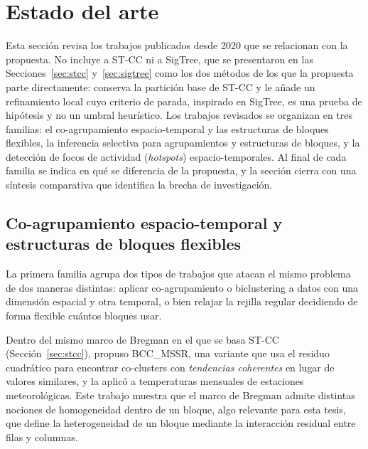 
\section{Estado del arte}
\label{sec:estado-arte}

Esta sección revisa los trabajos publicados desde 2020 que se relacionan con la
propuesta. No incluye a \ac{ST-CC} ni a SigTree, que se presentaron en las
Secciones~\ref{sec:stcc} y~\ref{sec:sigtree} como los dos métodos de los que la
propuesta parte directamente: conserva la partición base de \ac{ST-CC} y le
añade un refinamiento local cuyo criterio de parada, inspirado en SigTree, es una
prueba de hipótesis y no un umbral heurístico. Los trabajos revisados se
organizan en tres familias: el co-agrupamiento espacio-temporal y las
estructuras de bloques flexibles, la inferencia selectiva para agrupamientos y
estructuras de bloques, y la detección de focos de actividad (\emph{hotspots})
espacio-temporales. Al final de cada familia se indica en qué se diferencia de la
propuesta, y la sección cierra con una síntesis comparativa que identifica la
brecha de investigación.

\subsection{Co-agrupamiento espacio-temporal y estructuras de bloques flexibles}
\label{sec:ea_coagrupamiento}

La primera familia agrupa dos tipos de trabajos que atacan el mismo
problema de dos maneras distintas: aplicar co-agrupamiento o biclustering a
datos con una dimensión espacial y otra temporal, o bien relajar la rejilla
regular decidiendo de forma flexible cuántos bloques usar.

Dentro del mismo marco de Bregman en el que se basa \ac{ST-CC}
(Sección~\ref{sec:stcc}), \cite{Wu2022} propuso BCC\_MSSR, una
variante que usa el residuo cuadrático para encontrar co-clusters con
\emph{tendencias coherentes} en lugar de valores similares, y la aplicó a
temperaturas mensuales de estaciones meteorológicas. Este trabajo muestra
que el marco de Bregman admite distintas nociones de homogeneidad dentro de
un bloque, algo relevante para esta tesis, que define la heterogeneidad de
un bloque mediante la interacción residual entre filas y columnas.

